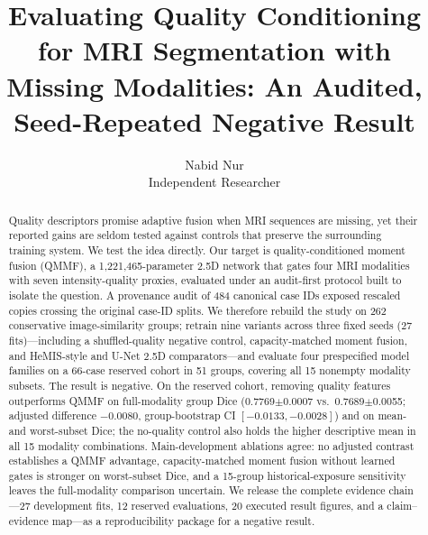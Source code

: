 \documentclass[10pt,twocolumn]{article}
\title{\textbf{Evaluating Quality Conditioning for MRI Segmentation with Missing Modalities: An Audited, Seed-Repeated Negative Result}}
\author{Nabid Nur\\[-1pt]
\small Independent Researcher}
\date{}
\begin{document}
\maketitle
\begin{abstract}
\noindent Quality descriptors promise adaptive fusion when MRI sequences are missing, yet their reported gains are seldom tested against controls that preserve the surrounding training system. We test the idea directly. Our target is quality-conditioned moment fusion (QMMF), a 1{,}221{,}465-parameter 2.5D network that gates four MRI modalities with seven intensity-quality proxies, evaluated under an audit-first protocol built to isolate the question. A provenance audit of 484 canonical case IDs exposed rescaled copies crossing the original case-ID splits. We therefore rebuild the study on 262 conservative image-similarity groups; retrain nine variants across three fixed seeds (27 fits)---including a shuffled-quality negative control, capacity-matched moment fusion, and HeMIS-style and U-Net 2.5D comparators---and evaluate four prespecified model families on a 66-case reserved cohort in 51 groups, covering all 15 nonempty modality subsets. The result is negative. On the reserved cohort, removing quality features outperforms QMMF on full-modality group Dice (0.7769$\pm$0.0007 vs.\ 0.7689$\pm$0.0055; adjusted difference $-0.0080$, group-bootstrap CI $[-0.0133,-0.0028]$) and on mean- and worst-subset Dice; the no-quality control also holds the higher descriptive mean in all 15 modality combinations. Main-development ablations agree: no adjusted contrast establishes a QMMF advantage, capacity-matched moment fusion without learned gates is stronger on worst-subset Dice, and a 15-group historical-exposure sensitivity leaves the full-modality comparison uncertain. We release the complete evidence chain---27 development fits, 12 reserved evaluations, 20 executed result figures, and a claim--evidence map---as a reproducibility package for a negative result.
\end{abstract}


















\end{document}
